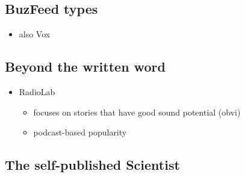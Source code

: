 \documentclass[letterpaper]{scrartcl}
\begin{document}
\subsection{BuzFeed types}\label{buzfeed-types}

\begin{itemize}
\itemsep1pt\parskip0pt
\item
  also Vox
\end{itemize}

\subsection{Beyond the written word}\label{beyond-the-written-word}

\begin{itemize}
\itemsep1pt\parskip0pt
\item
  RadioLab

  \begin{itemize}
  \itemsep1pt\parskip0pt
  \item
    focuses on stories that have good sound potential (obvi)
  \item
    podcast-based popularity
  \end{itemize}
\end{itemize}

\subsection{The self-published
Scientist}\label{the-self-published-scientist}
\end{document}
